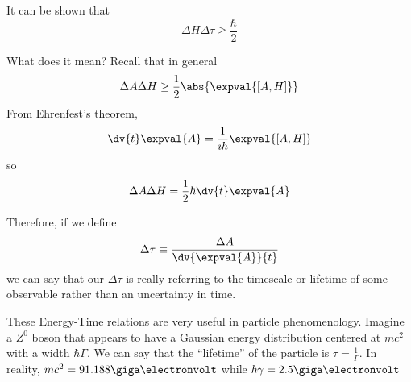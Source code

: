 \documentclass[a4paper,twoside,master.tex]{subfiles}
\begin{document}
It can be shown that
\begin{equation}
    \Delta H \Delta \tau \geq \frac{\hbar}{2}
\end{equation}

What does it mean? Recall that in general
\begin{equation}
    \Delta A \Delta H \geq \frac{1}{2} \abs{\expval{[A,H]}}
\end{equation}
From Ehrenfest's theorem,
\begin{equation}
    \dv{t}\expval{A} = \frac{1}{\imath\hbar} \expval{[A,H]}
\end{equation}
so
\begin{equation}
    \Delta A \Delta H = \frac{1}{2} \hbar \dv{t}\expval{A}
\end{equation}

Therefore, if we define
\begin{equation}
    \Delta \tau \equiv \frac{\Delta A}{\dv{\expval{A}}{t}}
\end{equation}
we can say that our $ \Delta \tau $ is really referring to the timescale or lifetime of some observable rather than an uncertainty in time.

\begin{ex}
    These Energy-Time relations are very useful in particle phenomenology. Imagine a $ Z^0 $ boson that appears to have a Gaussian energy distribution centered at $ mc^2 $ with a width $ \hbar \Gamma $. We can say that the ``lifetime'' of the particle is $ \tau = \frac{1}{\Gamma} $. In reality, $ mc^2 = 91.188\giga\electronvolt $ while $ \hbar\gamma = 2.5\giga\electronvolt $
\end{ex}
\end{document}
